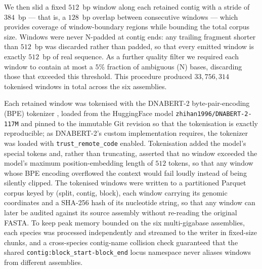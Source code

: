 \documentclass[twocolumn,10pt]{article}
\begin{document}
We then slid a fixed $512$~bp window along each retained contig with a stride of $384$~bp --- that
is, a $128$~bp overlap between consecutive windows --- which provides coverage of window-boundary
regions while bounding the total corpus size. Windows were never $\mathrm{N}$-padded at contig ends:
any trailing fragment shorter than $512$~bp was discarded rather than padded, so that every emitted
window is exactly $512$~bp of real sequence. As a further quality filter we required each window to
contain at most a $5\%$ fraction of ambiguous ($\mathrm{N}$) bases, discarding those that exceeded
this threshold. This procedure produced $33{,}756{,}314$ tokenised windows in total across the six
assemblies.

Each retained window was tokenised with the DNABERT-2 byte-pair-encoding (BPE) tokenizer
\citep{zhou2024dnabert}, loaded from the HuggingFace model \texttt{zhihan1996/DNABERT-2-117M} and
pinned to the immutable Git revision \texttt{} so
that the tokenisation is exactly reproducible; as DNABERT-2's custom implementation requires, the
tokenizer was loaded with \texttt{trust\_remote\_code} enabled. Tokenisation added the model's
special tokens and, rather than truncating, asserted that no window exceeded the model's maximum
position-embedding length of $512$ tokens, so that any window whose BPE encoding overflowed the
context would fail loudly instead of being silently clipped. The tokenised windows were written to a
partitioned Parquet corpus keyed by (split, contig, block), each window carrying its genomic
coordinates and a SHA-256 hash of its nucleotide string, so that any window can later be audited
against its source assembly without re-reading the original FASTA. To keep peak memory bounded on
the six multi-gigabase assemblies, each species was processed independently and streamed to the
writer in fixed-size chunks, and a cross-species contig-name collision check guaranteed that the
shared \texttt{contig:block\_start-block\_end} locus namespace never aliases windows from different
assemblies.
\end{document}
